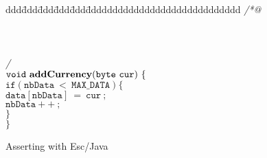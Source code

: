 \documentclass[a4paper]{llncs}
\begin{document}
\begin{figure}[hbt]
\begin{tabbing}
ddd\=ddd\=ddd\=ddd\=ddd\=ddddddddddddddddddddddddddddd \kill
{\it /*@ } \\
 \\
 \\
 \\
{\it */ } \\
$\mathtt{void\ {\bf addCurrency}(byte\ cur)\ \{}$ \\
\>$\mathtt{if(nbData\ <\ MAX\_DATA) \{}$ \\
\>\>$\mathtt{data[nbData]\ =\ cur\ ;}$ \\
\>\>$\mathtt{nbData++\ ;}$ \\
\>$\mathtt{\}}$ \\
$\mathtt{\}}$ 
\end{tabbing}
\caption{Asserting with {\sc Esc/Java}}
\label{fig-add-cur}
\end{figure}
\end{document}
